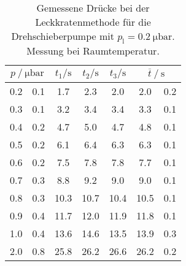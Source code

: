 \begin{table}
\centering
\caption{Gemessene Drücke bei der Leckkratenmethode für die Drehschieberpumpe mit $p_{\mathrm{l}}=\SI{0.2}{\micro\bar}$. Messung bei Raumtemperatur.}
\label{tab: leck_turbo_leck_0.2.pdf}
\begin{tabular}{S[table-format=1.1]@{${}\pm{}$} S[table-format=1.1] S S S S[table-format=1.1]@{${}\pm{}$} S[table-format=1.1] }
\toprule
{} & {$t_1 / \si{ \second}$} & {$t_2 / \si{ \second}$} & {$t_3 / \si{ \second}$} &  \\
 & 0.1 & 1.7 & 2.3 & 2.0 & 2.0 & 0.2\\
0.3 & 0.1 & 3.2 & 3.4 & 3.4 & 3.3 & 0.1\\
0.4 & 0.2 & 4.7 & 5.0 & 4.7 & 4.8 & 0.1\\
0.5 & 0.2 & 6.1 & 6.4 & 6.3 & 6.3 & 0.1\\
0.6 & 0.2 & 7.5 & 7.8 & 7.8 & 7.7 & 0.1\\
0.7 & 0.3 & 8.8 & 9.2 & 9.0 & 9.0 & 0.1\\
0.8 & 0.3 & 10.3 & 10.7 & 10.4 & 10.5 & 0.1\\
0.9 & 0.4 & 11.7 & 12.0 & 11.9 & 11.8 & 0.1\\
1.0 & 0.4 & 13.6 & 14.6 & 13.5 & 13.9 & 0.3\\
2.0 & 0.8 & 25.8 & 26.2 & 26.6 & 26.2 & 0.2\\
\bottomrule
\end{tabular}
\end{table}

